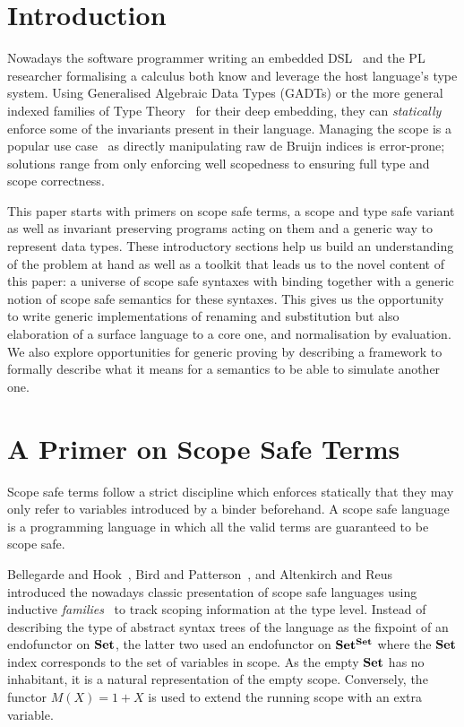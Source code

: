
\section{Introduction}

Nowadays the software programmer writing an embedded DSL~\cite{hudak1996building}
and the PL researcher formalising a calculus both know and
leverage the host language's type system. Using Generalised
Algebraic Data Types (GADTs) or the more general indexed
families of Type Theory~\cite{dybjer1994inductive} for their deep embedding, they can
\emph{statically} enforce some of the invariants present in
their language. Managing the scope is a popular use case~\cite{altenkirch1999monadic} as
directly manipulating raw de Bruijn indices is error-prone;
solutions range from only enforcing well scopedness to ensuring
full type and scope correctness.

This paper starts with primers on scope safe terms, a scope and type
safe variant as well as invariant preserving programs acting on them
and a generic way to represent data types. These introductory sections
help us build an understanding of the problem at hand as well as a
toolkit that leads us to the novel content of this paper: a universe
of scope safe syntaxes with binding together with a generic notion of
scope safe semantics for these syntaxes.
This gives us the opportunity to write generic implementations of renaming
and substitution but also elaboration of a surface language to a core one,
and normalisation by evaluation. We also explore opportunities for
generic proving by describing a framework to formally describe what
it means for a semantics to be able to simulate another one.




\section{A Primer on Scope Safe Terms}\label{section:primer-term}

Scope safe terms follow a strict discipline which enforces statically
that they may only refer to variables introduced by a binder beforehand. A
scope safe language is a programming language in which all the valid terms
are guaranteed to be scope safe.

Bellegarde and Hook~\citeyear{BELLEGARDE1994287}, Bird and Patterson~\citeyear{bird_paterson_1999},
and Altenkirch and Reus~\citeyear{altenkirch1999monadic} introduced the
nowadays classic presentation of scope safe languages using inductive
\emph{families}~\cite{dybjer1994inductive} to track scoping information
at the type level. Instead of describing the type of abstract syntax trees
of the language as the fixpoint of an endofunctor on $\mathbf{Set}{}$, the latter two used
an endofunctor on $\mathbf{Set}{}^{\mathbf{Set}{}}$ where the $\mathbf{Set}{}$ index corresponds
to the set of variables in scope. As the empty $\mathbf{Set}$ has no inhabitant,
it is a natural representation of the empty scope. Conversely, the functor
$M(X) = 1 + X$ is used to extend the running scope with an extra variable.

